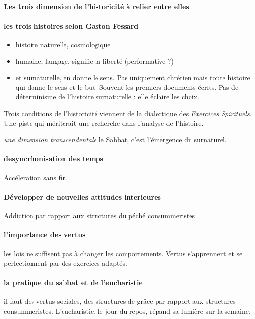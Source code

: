 \paragraph{Les trois dimension de l'historicité à relier entre elles}

\paragraph{les trois histoires selon Gaston Fessard}
\begin{itemize}
    \item histoire naturelle, cosmologique
    \item  humaine, langage, signifie la liberté (performative ?)
    \item et surnaturelle, en donne le sens. Pas uniquement chrétien mais toute histoire qui donne le sens et le but. Souvent les premiers documents écrits. Pas de déterminisme de l'histoire surnaturelle : elle éclaire les choix.
\end{itemize}
Trois conditions de l'historicité viennent de la dialectique des \textit{Exercices Spirituels}. Une piste qui mériterait une recherche dans l'analyse de l'histoire. 

\textit{une dimension transcendentale } le Sabbat, c'est l'émergence du surnaturel. 

\paragraph{desyncrhonisation des temps}
Accéleration sans fin. 

\paragraph{Développer de nouvelles attitudes interieures}
Addiction par rapport aux structures du péché consummeristes

\paragraph{l'importance des vertus} les lois ne suffisent pas à changer les comportements. Vertus s'apprennent et se perfectionnent par des exercices adaptés.

\paragraph{la pratique du sabbat et de l'eucharistie} il faut des vertus sociales, des structures de grâce par rapport aux structures consummeristes. L'eucharistie, le jour du repos, répand sa lumière sur la semaine. 

